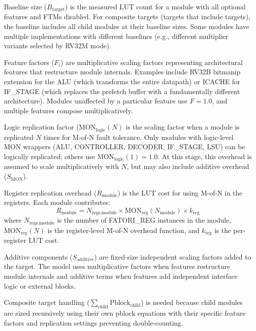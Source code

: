 Baseline size ($B_{\text{target}}$) is the measured \ac{LUT} count for a module with all optional features and \acp{FTM} disabled. For composite targets (targets that include targets), the baseline includes all child modules at their baseline sizes. Some modules have multiple implementations with different baselines (e.g., different multiplier variants selected by RV32M mode).

Feature factors ($F_i$) are multiplicative scaling factors representing architectural features that restructure module internals. Examples include RV32B bitmanip extension for the \ac{ALU} (which transforms the entire datapath) or ICACHE for IF\_STAGE (which replaces the prefetch buffer with a fundamentally different architecture). Modules unaffected by a particular feature use $F=1.0$, and multiple features compose multiplicatively.

Logic replication factor ($\text{MON}_{\text{logic}}(N)$ is the scaling factor when a module is replicated $N$ times for M-of-N fault tolerance. Only modules with logic-level MON wrappers (\ac{ALU}, CONTROLLER, DECODER, IF\_STAGE, \ac{LSU}) can be logically replicated; others use $\text{MON}_{\text{logic}}(1) = 1.0$. At this stage, this overhead is assumed to scale multiplicatively with $N$, but may also include additive overhead ($S_{\text{MON}}$).

Register replication overhead ($R_{\text{module}}$) is the \ac{LUT} cost for using M-of-N in the registers. Each module contributes:
\begin{equation}
R_{\text{module}} = N_{\text{regs,module}} \times \text{MON}_{\text{reg}}(N_{\text{module}}) \times k_{\text{reg}}
\label{eq:register_component}
\end{equation}
where $N_{\text{regs,module}}$ is the number of FATORI\_REG instances in the module, $\text{MON}_{\text{reg}}(N)$ is the register-level M-of-N overhead function, and $k_{\text{reg}}$ is the per-register \ac{LUT} cost.

Additive components ($S_{\text{additive}}$) are fixed-size independent scaling factors added to the target. The model uses multiplicative factors when features restructure module internals and additive terms when features add independent interface logic or external blocks.

Composite target handling ($\sum_{\text{child}} \text{Pblock}_{\text{child}}$) is needed because child modules are sized recursively using their own pblock equations with their specific feature factors and replication settings preventing double-counting.

